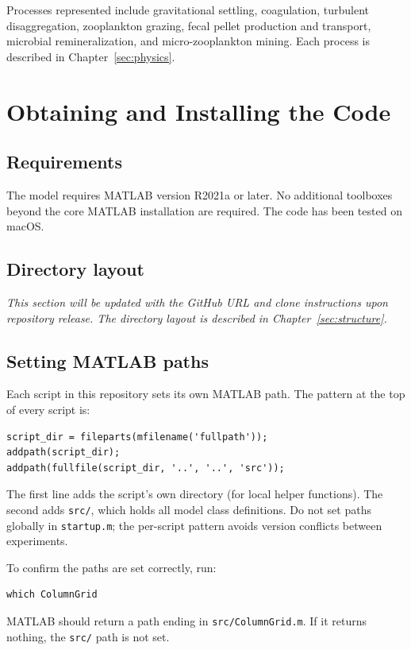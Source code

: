 \documentclass[12pt,a4paper]{report}
\numberwithin{equation}{chapter}
\begin{document}
Processes represented include gravitational settling, coagulation,
turbulent disaggregation, zooplankton grazing, fecal pellet production and
transport, microbial remineralization, and micro-zooplankton mining.
Each process is described in Chapter~\ref{sec:physics}.

\chapter{Obtaining and Installing the Code}

\section{Requirements}

The model requires MATLAB version R2021a or later. No additional toolboxes
beyond the core MATLAB installation are required. The code has been tested
on macOS.

\section{Directory layout}

\textit{This section will be updated with the GitHub URL and clone instructions
upon repository release. The directory layout is described in
Chapter~\ref{sec:structure}.}

\section{Setting MATLAB paths}

Each script in this repository sets its own MATLAB path. The pattern at the
top of every script is:

\begin{lstlisting}
script_dir = fileparts(mfilename('fullpath'));
addpath(script_dir);
addpath(fullfile(script_dir, '..', '..', 'src'));
\end{lstlisting}

The first line adds the script's own directory (for local helper functions).
The second adds \texttt{src/}, which holds all model class definitions.
Do not set paths globally in \texttt{startup.m}; the per-script pattern
avoids version conflicts between experiments.

To confirm the paths are set correctly, run:
\begin{lstlisting}[numbers=none]
which ColumnGrid
\end{lstlisting}
MATLAB should return a path ending in \texttt{src/ColumnGrid.m}.
If it returns nothing, the \texttt{src/} path is not set.
\end{document}
